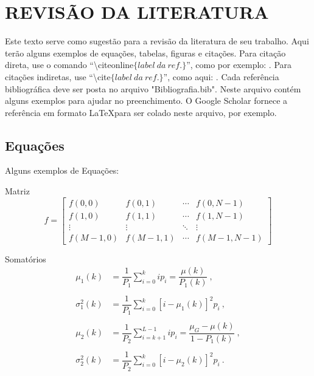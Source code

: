 
\chapter{REVISÃO DA LITERATURA} \label{cap:estadodaarte} 


Este texto serve como sugestão para a revisão da literatura de seu trabalho. Aqui terão alguns exemplos de equações, tabelas, figuras e citações. Para citação direta, use o comando ``\textbackslash citeonline$\{label\ da\ ref. \}$'', como por exemplo: . Para citações indiretas, use ``\textbackslash cite$\{label\ da\ ref. \}$'', como aqui: \cite{combustaoaplicada}. Cada referência bibliográfica deve ser posta no arquivo "Bibliografia.bib". Neste arquivo contém alguns exemplos para ajudar no preenchimento. O Google Scholar fornece a referência em formato \LaTeX para ser colado neste arquivo, por exemplo.

\section{Equações}

Alguns exemplos de Equações:

Matriz
\begin{equation}
  f=  \left[\begin{array}{cccc}
         f(0,0) & f(0,1) & \cdots & f(0,N-1)  \\
         f(1,0) & f(1,1) & \cdots & f(1,N-1)  \\
         \vdots & \vdots & \ddots & \vdots \\
         f(M-1,0) & f(M-1,1) & \cdots & f(M-1,N-1)
    \end{array}\right]
\end{equation}

Somatórios
\begin{equation} \label{eq:médiasevarianciasOTSU}
  \begin{array}{rl}
        \mu_1(k)&=\dfrac{1}{P_1}\displaystyle\sum^{k}_{i=0}ip_i= \dfrac{\mu(k)}{P_1(k)} \ ,\\ 
                     \\
        \sigma_1^2(k)&=\dfrac{1}{P_1}\displaystyle\sum^{k}_{i=0}\left[i-\mu_1(k)\right]^2p_i \ ,\\
                     \\
        \mu_2(k)&=\dfrac{1}{P_2}\displaystyle\sum^{L-1}_{i=k+1}ip_i=\dfrac{\mu_G-\mu(k)}{1-P_1(k)} \ ,\\
                     \\
        \sigma_2^2(k)&=\dfrac{1}{P_2}\displaystyle\sum^{k}_{i=0}\left[i-\mu_2(k)\right]^2p_i \ .\\
    \end{array}
\end{equation}

